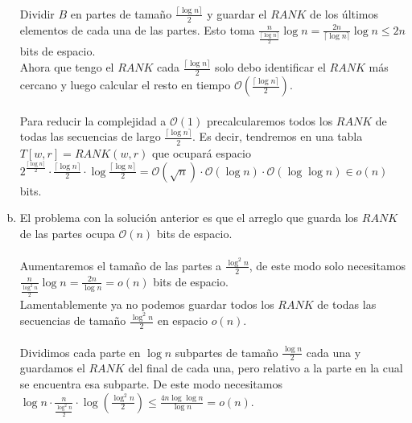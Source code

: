 \documentclass[dcc,uchile]{fcfmcourse}
\theoremstyle{plain}
\theoremstyle{definition}
\begin{document}
\begin{problems}
\begin{enumerate}[a)]
\idea\\
Dividir $B$ en partes de tamaño $\frac{\lceil \log n \rceil}{2}$ y guardar el $RANK$ de los últimos elementos de cada una de las partes. Esto toma $\frac{n}{\frac{\lceil \log n \rceil}{2}}\log n = \frac{2n}{\lceil \log n \rceil}\log n \le 2n$ bits de espacio.\\
Ahora que tengo el $RANK$ cada $\frac{\lceil \log n \rceil}{2}$ solo debo identificar el $RANK$ más cercano y luego calcular el resto en tiempo $\mathcal{O}\left(\frac{\lceil \log n \rceil}{2}\right)$. \\
\idea\\
Para reducir la complejidad a $\mathcal{O}(1)$ precalcularemos todos los $RANK$ de todas las secuencias de largo $\frac{\lceil \log n \rceil}{2}$. Es decir, tendremos en una tabla $T[w,r] = RANK(w,r)$ que ocupará espacio $2^{\frac{\lceil \log n \rceil}{2}} \cdot \frac{\lceil \log n \rceil}{2} \cdot \log{\frac{\lceil \log n \rceil}{2}} = \mathcal{O}(\sqrt{n})\cdot \mathcal{O}(\log n) \cdot \mathcal{O}(\log \log n) \in o(n)$ bits.\wedidit  
\item El problema con la solución anterior es que el arreglo que guarda los $RANK$ de las partes ocupa $\mathcal{O}(n)$ bits de espacio.\\
\idea\\
Aumentaremos el tamaño de las partes a $\frac{\log^2 n}{2}$, de este modo solo necesitamos $\frac{n}{\frac{\log^2 n }{2}}\log n = \frac{2n}{\log n } = o(n)$ bits de espacio.\\
Lamentablemente ya no podemos guardar todos los $RANK$ de todas las secuencias de tamaño $\frac{\log^2 n}{2}$ en espacio $o(n)$. \crying\\
\idea\\
Dividimos cada parte en $\log n$ subpartes de tamaño $\frac{\log n}{2}$ cada una y guardamos el $RANK$ del final de cada una, pero relativo a la parte en la cual se encuentra esa subparte. De este modo necesitamos $\log n \cdot \frac{n}{\frac{\log^2 n}{2}} \cdot \log \left(\frac{\log^2 n}{2}\right) \le \frac{4n\log \log n}{\log n} = o(n)$. \wedidit
\end{enumerate}
\end{problems}
\end{document}
